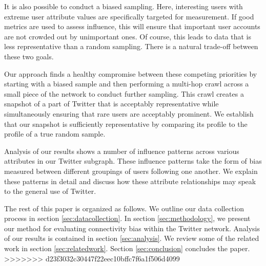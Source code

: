 It is also possible to conduct a biased sampling.  Here, interesting users with extreme user attribute values are specifically targeted for measurement.  If good 
metrics are used to assess influence, this will ensure that important user accounts are not crowded out by unimportant ones.  Of course, this leads to data that is less 
representative than a random sampling.  There is a natural trade-off between these two goals.

Our approach finds a healthy compromise between these competing priorities by starting with a biased sample and then performing a multi-hop crawl across a small piece of 
the network to conduct further sampling.  This crawl creates a snapshot of a part of Twitter that is acceptably representative while simultaneously ensuring that rare 
users are acceptably prominent.  We establish that our snapshot is sufficiently representative by comparing its profile to the profile of a true random sample.

Analysis of our results shows a number of influence patterns across various attributes in our Twitter subgraph.  These influence patterns take the form of bias measured 
between different groupings of users following one another.  We explain these patterns in detail and discuss how these attribute relationships may speak to the general 
use of Twitter.

The rest of this paper is organized as follows.  We outline our data collection process in section \ref{sec:datacollection}.  In section \ref{sec:methodology}, we 
present our method for evaluating connectivity bias within the Twitter network.  Analysis of our results is contained in section \ref{sec:analysis}.  We review some of 
the related work in section \ref{sec:relatedwork}.  Section \ref{sec:conclusion} concludes the paper.
>>>>>>> d23f3032c30447f22eec10bffc7f6a1f506d4099
